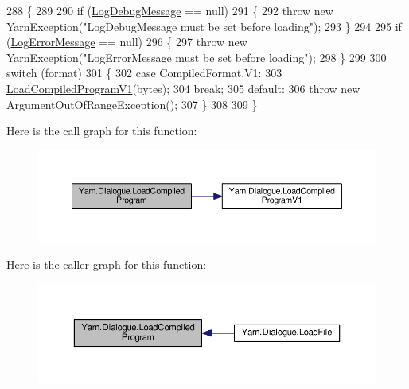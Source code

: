 \begin{DoxyCode}
288         \{
289 
290             \textcolor{keywordflow}{if} (\hyperlink{a00082_a381f48bb0fbb294f8cf44ca57f11be31}{LogDebugMessage} == null)
291             \{
292                 \textcolor{keywordflow}{throw} \textcolor{keyword}{new} YarnException(\textcolor{stringliteral}{"LogDebugMessage must be set before loading"});
293             \}
294 
295             \textcolor{keywordflow}{if} (\hyperlink{a00082_a9801e83dd044d6498fdf6ebcc6bec5ac}{LogErrorMessage} == null)
296             \{
297                 \textcolor{keywordflow}{throw} \textcolor{keyword}{new} YarnException(\textcolor{stringliteral}{"LogErrorMessage must be set before loading"});
298             \}
299 
300             \textcolor{keywordflow}{switch} (format)
301             \{
302                 \textcolor{keywordflow}{case} CompiledFormat.V1:
303                     \hyperlink{a00082_a706df08e842c2419f7a66fd40c0a544f}{LoadCompiledProgramV1}(bytes);
304                     \textcolor{keywordflow}{break};
305                 \textcolor{keywordflow}{default}:
306                     \textcolor{keywordflow}{throw} \textcolor{keyword}{new} ArgumentOutOfRangeException();
307             \}
308 
309         \}
\end{DoxyCode}


Here is the call graph for this function\-:
\nopagebreak
\begin{figure}[H]
\begin{center}
\leavevmode
\includegraphics[width=350pt]{a00082_a4bc1ceca26754dc3ec0a2281dfee26ce_cgraph}
\end{center}
\end{figure}




Here is the caller graph for this function\-:
\nopagebreak
\begin{figure}[H]
\begin{center}
\leavevmode
\includegraphics[width=350pt]{a00082_a4bc1ceca26754dc3ec0a2281dfee26ce_icgraph}
\end{center}
\end{figure}


